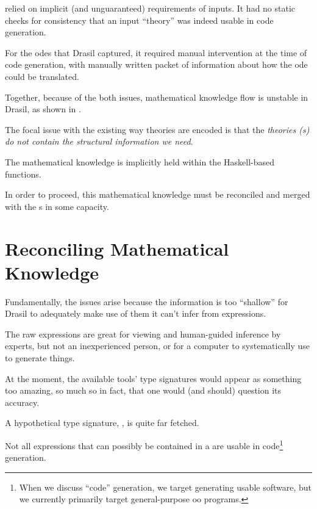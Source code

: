 \relToQD{} relied on implicit (and unguaranteed) requirements of inputs. It had
no static checks for consistency that an input ``theory'' was indeed usable in
code generation.




For the \acsp{ode} that Drasil captured, it required manual intervention at the
time of code generation, with manually written packet of information about how
the \acs{ode} could be translated.




Together, because of the both issues, mathematical knowledge flow is unstable in
Drasil, as shown in .

The focal issue with the existing way theories are encoded is that the
\textit{theories (\RelationConcept{}s) do not contain the structural information
we need}.

The mathematical knowledge is implicitly held within the Haskell-based
functions.

In order to proceed, this mathematical knowledge must be reconciled and merged
with the \RelationConcept{}s in some capacity.

\theoriesWithoutModelKinds{}

\section{Reconciling Mathematical Knowledge}




Fundamentally, the issues arise because the information is too ``shallow'' for
Drasil to adequately make use of them \textemdash{} it can't infer from
expressions.

The raw expressions are great for viewing and human-guided inference by experts,
but not an inexperienced person, or for a computer to systematically use to
generate things.

At the moment, the available tools' type signatures would appear as something
too amazing, so much so in fact, that one would (and should) question its
accuracy.

A hypothetical type signature, , is quite far
fetched.

Not all expressions that can possibly be contained in a \RelationConcept{} are
usable in code\footnote{When we discuss ``code'' generation, we target
generating usable software, but we currently primarily target general-purpose
\acs{oo} programs.} generation.

